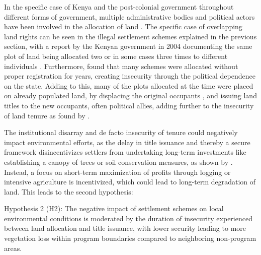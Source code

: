 In the specific case of Kenya and the post-colonial government throughout different forms of government, multiple administrative bodies and political actors have been involved in the allocation of land \parencite{ndunguReportComissionInquiry2004}.
The specific case of overlapping land rights can be seen in the illegal settlement schemes explained in the previous section,
with a report by the Kenyan government in 2004 documenting the same plot of land being allocated two or in some cases three times to different individuals \parencite{ndunguReportComissionInquiry2004}.
Furthermore, \cite{boonePromisedLandSettlement2021,booneLandConflictDistributive2012} found that many schemes were allocated without proper registration for years, creating insecurity through the political dependence on the state.
Adding to this, many of the plots allocated at the time were placed on already populated land, by displacing the original occupants \parencite{ndunguReportComissionInquiry2004},
and issuing land titles to the new occupants, often political allies, adding further to the insecurity of land tenure as found by \cite{booneLandConflictDistributive2012}.

The institutional disarray and de facto insecurity of tenure could negatively impact environmental efforts,
as the delay in title issuance and thereby a secure framework disincentivizes settlers from undertaking long-term investments like establishing a canopy of trees
or soil conservation measures, as shown by \cite{aberraDoesLegalRepresentation2021}.
Instead, a focus on short-term maximization of profits through logging or intensive agriculture is incentivized, which could lead to long-term degradation of land.
This leads to the second hypothesis:

Hypothesis 2 (H2): The negative impact of settlement schemes on local environmental conditions is moderated by the duration of insecurity experienced between land allocation and title issuance,
with lower security leading to more vegetation loss within program boundaries compared to neighboring non-program areas.